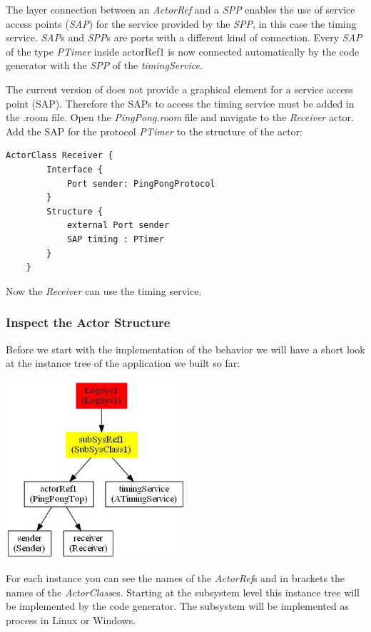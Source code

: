 The layer connection between an \emph{ActorRef} and a \emph{SPP} enables the use of service access points (\emph{SAP}) for the service provided by the \emph{SPP}, in this case the timing service. \emph{SAP}s and \emph{SPP}s are ports with a different kind of connection. Every \emph{SAP} of the type \emph{PTimer} inside actorRef1 is now connected automatically by the code generator with the \emph{SPP} of the \emph{timingService}.

The current version of \eTrice{} does not provide a graphical element for a service access point (SAP). 
Therefore the SAPs to access the timing service must be added in the .room file. Open the 
\textit{PingPong.room} file and navigate to the \textit{Receiver} actor. Add the SAP for the protocol \emph{PTimer} to the structure of the actor:

\begin{lstlisting}[language=ROOM]
	ActorClass Receiver {
		Interface {
			Port sender: PingPongProtocol
		}
		Structure {
			external Port sender
			SAP timing : PTimer
		}
	}
\end{lstlisting}

Now the \emph{Receiver} can use the timing service.

\subsubsection{Inspect the Actor Structure}
Before we start with the implementation of the behavior we will have a short look at the instance tree of the application we built so far:

\includegraphics[width=0.5\textwidth]{images/017-09-PingPong_InstanceTree.jpg}

For each instance you can see the names of the \emph{ActorRef}s and in brackets the names of the \emph{ActorClass}es. Starting at the subsystem level this instance tree will be implemented by the code generator. The subsystem will be implemented as process in Linux or Windows.


